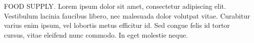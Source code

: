 FOOD SUPPLY. Lorem ipsum dolor sit amet, consectetur adipiscing elit. Vestibulum lacinia faucibus libero, nec malesuada dolor volutpat vitae. Curabitur varius enim ipsum, vel lobortis metus efficitur id. Sed congue felis id tortor cursus, vitae eleifend nunc commodo. In eget molestie neque.
